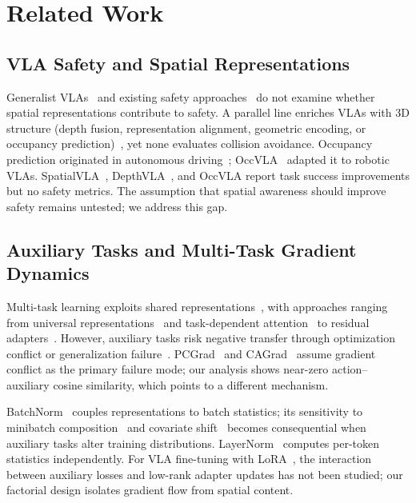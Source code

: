 
\section{Related Work}

\subsection{VLA Safety and Spatial Representations}

Generalist VLAs~\cite{black2024pi0, team2024octo} and existing safety approaches~\cite{hu2025vlsa, zhai2026cofreevla, raja2024ogmcbf, zhang2025safevla} do not examine whether spatial representations contribute to safety. A parallel line enriches VLAs with 3D structure (depth fusion, representation alignment, geometric encoding, or occupancy prediction)~\cite{yuan2025depthvla, li2025qdepthvla, rao2026augvla3d, bhat20253dcavla, abouzeid2025geoaware, yang2024depthanything, li2026spatialforcing, wu2025spatialvla, li2025pointvla, sun2025geovla, wu2026stvla, chen2026gstvla, tu2026sgvla, xiao2026stemvla, li2026corridorvla, liu2025occvla, li2022bevformer, sima2023occnet, tian2023occ3d}, yet none evaluates collision avoidance. Occupancy prediction originated in autonomous driving~\cite{li2022bevformer, sima2023occnet, tian2023occ3d}; OccVLA~\cite{liu2025occvla} adapted it to robotic VLAs. SpatialVLA~\cite{wu2025spatialvla}, DepthVLA~\cite{yuan2025depthvla}, and OccVLA report task success improvements but no safety metrics. The assumption that spatial awareness should improve safety remains untested; we address this gap.

\subsection{Auxiliary Tasks and Multi-Task Gradient Dynamics}

Multi-task learning exploits shared representations~\cite{caruana1997multitask, ruder2017overview}, with approaches ranging from universal representations~\cite{bilen2017universal} and task-dependent attention~\cite{maninis2019astmt} to residual adapters~\cite{rebuffi2018adapters}. However, auxiliary tasks risk negative transfer through optimization conflict or generalization failure~\cite{chen2018gradnorm, yu2020pcgrad, liu2021cagrad, navon2022nashmtl, jiang2023forkmerge}. PCGrad~\cite{yu2020pcgrad} and CAGrad~\cite{liu2021cagrad} assume gradient conflict as the primary failure mode; our analysis shows near-zero action--auxiliary cosine similarity, which points to a different mechanism.

BatchNorm~\cite{ioffe2015batchnorm} couples representations to batch statistics; its sensitivity to minibatch composition~\cite{ioffe2017renorm} and covariate shift~\cite{schneider2020bn, li2017adabn} becomes consequential when auxiliary tasks alter training distributions. LayerNorm~\cite{ba2016layernorm} computes per-token statistics independently. For VLA fine-tuning with LoRA~\cite{hu2022lora}, the interaction between auxiliary losses and low-rank adapter updates has not been studied; our factorial design isolates gradient flow from spatial content.
